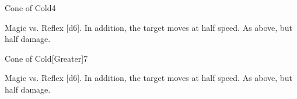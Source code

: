 \begin{spellsection}{Cone of Cold}{4}
    \begin{spellheader}
    \end{spellheader}
    \begin{spellcontent}
        \begin{spelltargetinginfo}
        \end{spelltargetinginfo}
        \begin{spelleffects}
            \begin{spellattack}{Magic vs. Reflex}
                \spellsuccess {}[d6]. In addition, the target moves at half speed.
                \spellfailure As above, but half damage.
            \end{spellattack}
            \spelldur \durshort
        \end{spelleffects}
    \end{spellcontent}
    \begin{spellfooter}
        \miscastexplode
    \end{spellfooter}
\end{spellsection}

\begin{spellsection}{Cone of Cold}[Greater]{7}
    \begin{spellheader}
    \end{spellheader}
    \begin{spellcontent}
        \begin{spelltargetinginfo}
        \end{spelltargetinginfo}
        \begin{spelleffects}
            \begin{spellattack}{Magic vs. Reflex}
                \spellsuccess {}[d6]. In addition, the target moves at half speed.
                \spellfailure As above, but half damage.
            \end{spellattack}
        \end{spelleffects}
    \end{spellcontent}
    \begin{spellfooter}
        \miscastexplode
    \end{spellfooter}
\end{spellsection}

